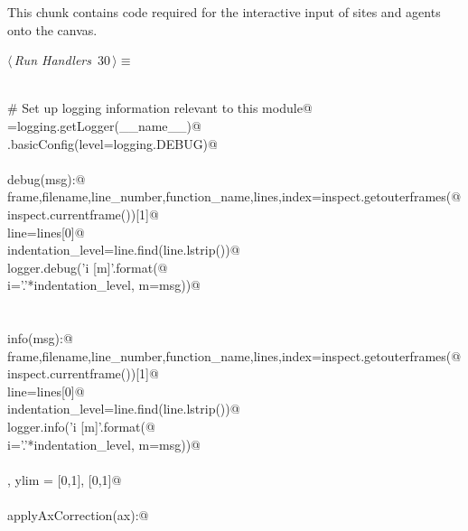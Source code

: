 \documentclass[10pt, english, oneside]{report}
\begin{document}
\begin{appendices}
This chunk contains code required for the interactive input of sites and agents onto the canvas. 

\begin{flushleft} \small\label{scrap33}\raggedright\small
{} $\langle\,${\itshape Run Handlers}\nobreak\ {\footnotesize {30}}$\,\rangle\equiv$
\vspace{-1ex}
\begin{list}{}{} \item
\mbox{}\verb@@\\
\mbox{}\verb@# Set up logging information relevant to this module@\\
\mbox{}\verb@logger=logging.getLogger(__name__)@\\
\mbox{}\verb@logging.basicConfig(level=logging.DEBUG)@\\
\mbox{}\verb@@\\
\mbox{}\verb@def debug(msg):@\\
\mbox{}\verb@    frame,filename,line_number,function_name,lines,index=inspect.getouterframes(@\\
\mbox{}\verb@        inspect.currentframe())[1]@\\
\mbox{}\verb@    line=lines[0]@\\
\mbox{}\verb@    indentation_level=line.find(line.lstrip())@\\
\mbox{}\verb@    logger.debug('{i} [{m}]'.format(@\\
\mbox{}\verb@        i='.'*indentation_level, m=msg))@\\
\mbox{}\verb@@\\
\mbox{}\verb@@\\
\mbox{}\verb@def info(msg):@\\
\mbox{}\verb@    frame,filename,line_number,function_name,lines,index=inspect.getouterframes(@\\
\mbox{}\verb@        inspect.currentframe())[1]@\\
\mbox{}\verb@    line=lines[0]@\\
\mbox{}\verb@    indentation_level=line.find(line.lstrip())@\\
\mbox{}\verb@    logger.info('{i} [{m}]'.format(@\\
\mbox{}\verb@        i='.'*indentation_level, m=msg))@\\
\mbox{}\verb@@\\
\mbox{}\verb@xlim, ylim = [0,1], [0,1]@\\
\mbox{}\verb@@\\
\mbox{}\verb@def applyAxCorrection(ax):@\\

\end{list}
\end{flushleft}
\end{appendices}
\end{document}
